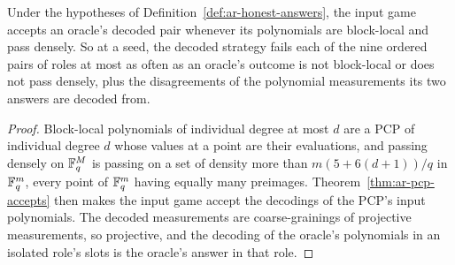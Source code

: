 \begin{lemma}
\label{lem:ar-decoded-accepts}
\leanok
Under the hypotheses of Definition~\ref{def:ar-honest-answers}, the input game accepts an
oracle's decoded pair whenever its polynomials are block-local and pass densely. So at a seed, the
decoded strategy fails each of the nine ordered pairs of roles at most as often as an oracle's
outcome is not block-local or does not pass densely, plus the disagreements of the polynomial
measurements its two answers are decoded from.
\end{lemma}

\begin{proof}
\leanok
Block-local polynomials of individual degree at most $d$ are a PCP of individual degree $d$ whose
values at a point are their evaluations, and passing densely on $\mathbb{F}_q^M$ is passing on a set of
density more than $m (5 + 6 (d + 1))/q$ in $\mathbb{F}_q^m$, every point of $\mathbb{F}_q^m$ having equally many
preimages. Theorem~\ref{thm:ar-pcp-accepts} then makes the input game accept the decodings of the
PCP's input polynomials. The decoded measurements are coarse-grainings of projective measurements,
so projective, and the decoding of the oracle's polynomials in an isolated role's slots is the
oracle's answer in that role.
\end{proof}

